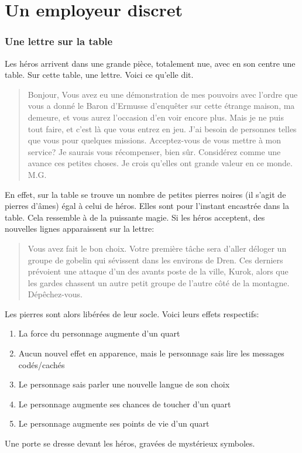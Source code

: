 \documentclass[a4paper, 11pt]{article}
\begin{document}
\part{Un employeur discret}
\section{Une lettre sur la table}
Les héros arrivent dans une grande pièce, totalement nue, avec en son centre une table. Sur cette table, une lettre. Voici ce qu'elle dit.
\begin{quotation}
Bonjour,
\newline
Vous avez eu une démonstration de mes pouvoirs avec l'ordre que vous a donné le Baron d'Ermusse d’enquêter sur cette étrange maison, ma demeure, et vous aurez l'occasion d'en voir encore plus. Mais je ne puis tout faire, et c'est là que vous entrez en jeu. J'ai besoin de personnes telles que vous pour quelques missions. Acceptez-vous de vous mettre à mon service?
\newline
Je saurais vous récompenser, bien sûr. Considérez comme une avance ces petites choses. Je crois qu'elles ont grande valeur en ce monde.
\newline
M.G.
\end{quotation}
En effet, sur la table se trouve un nombre de petites pierres noires (il s'agit de pierres d'âmes) égal à celui de héros. Elles sont pour l'instant encastrée dans la table. Cela ressemble à de la puissante magie. Si les héros acceptent, des nouvelles lignes apparaissent sur la lettre:
\begin{quotation}
Vous  avez fait le bon choix. Votre première tâche sera d'aller déloger un groupe de gobelin qui sévissent dans les environs de Dren. Ces derniers prévoient une attaque d'un des avants poste de la ville, Kurok, alors que les gardes chassent un autre petit groupe de l'autre côté de la montagne. Dépêchez-vous.
\end{quotation}
Les pierres sont alors libérées de leur socle. Voici leurs effets respectifs:
\begin{enumerate}
\item La force du personnage augmente d'un quart
\item Aucun nouvel effet en apparence, mais le personnage sais lire les messages codés/cachés
\item Le personnage sais parler une nouvelle langue de son choix
\item Le personnage augmente ses chances de toucher d'un quart
\item Le personnage augmente ses points de vie d'un quart
\end{enumerate}
Une porte se dresse devant les héros, gravées de mystérieux symboles.
\end{document}
